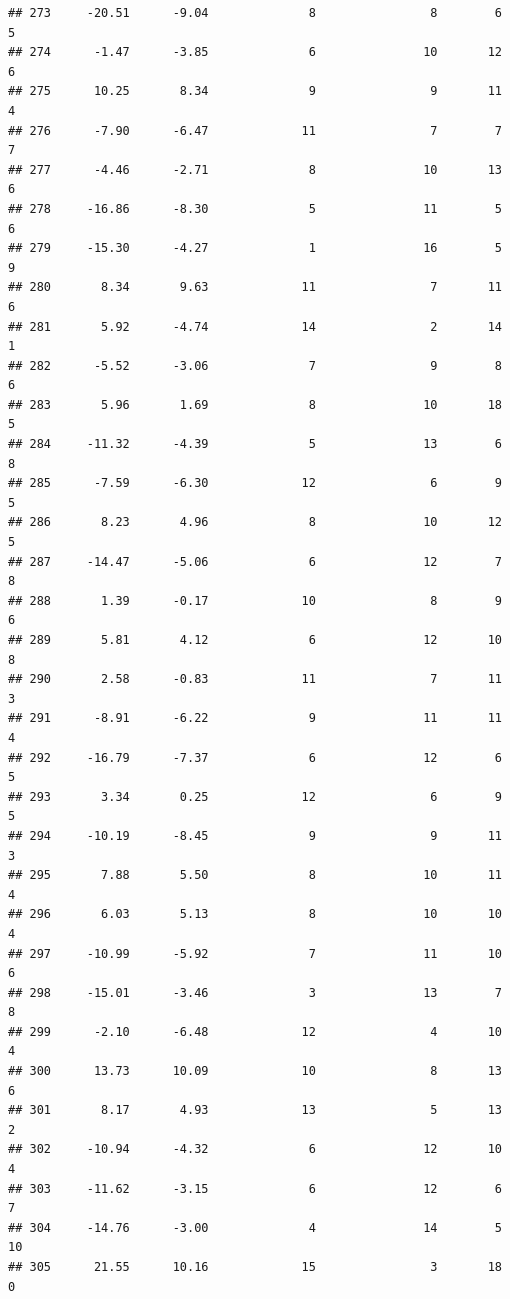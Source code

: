\documentclass[]{book}
\begin{document}
\begin{verbatim}
## 273     -20.51      -9.04              8                8        6          5
## 274      -1.47      -3.85              6               10       12          6
## 275      10.25       8.34              9                9       11          4
## 276      -7.90      -6.47             11                7        7          7
## 277      -4.46      -2.71              8               10       13          6
## 278     -16.86      -8.30              5               11        5          6
## 279     -15.30      -4.27              1               16        5          9
## 280       8.34       9.63             11                7       11          6
## 281       5.92      -4.74             14                2       14          1
## 282      -5.52      -3.06              7                9        8          6
## 283       5.96       1.69              8               10       18          5
## 284     -11.32      -4.39              5               13        6          8
## 285      -7.59      -6.30             12                6        9          5
## 286       8.23       4.96              8               10       12          5
## 287     -14.47      -5.06              6               12        7          8
## 288       1.39      -0.17             10                8        9          6
## 289       5.81       4.12              6               12       10          8
## 290       2.58      -0.83             11                7       11          3
## 291      -8.91      -6.22              9               11       11          4
## 292     -16.79      -7.37              6               12        6          5
## 293       3.34       0.25             12                6        9          5
## 294     -10.19      -8.45              9                9       11          3
## 295       7.88       5.50              8               10       11          4
## 296       6.03       5.13              8               10       10          4
## 297     -10.99      -5.92              7               11       10          6
## 298     -15.01      -3.46              3               13        7          8
## 299      -2.10      -6.48             12                4       10          4
## 300      13.73      10.09             10                8       13          6
## 301       8.17       4.93             13                5       13          2
## 302     -10.94      -4.32              6               12       10          4
## 303     -11.62      -3.15              6               12        6          7
## 304     -14.76      -3.00              4               14        5         10
## 305      21.55      10.16             15                3       18          0

\end{verbatim}
\end{document}
